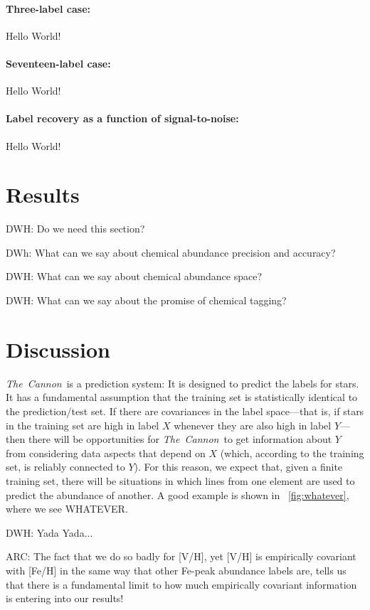\documentclass[12pt,preprint]{aastex}
\newcommand{\project}[1]{\textsl{#1}}
\newcommand{\TheCannon}{\project{The~Cannon}}
\begin{document}
\paragraph{Three-label case:}
Hello World!

\paragraph{Seventeen-label case:}
Hello World!

\paragraph{Label recovery as a function of signal-to-noise:}
Hello World!

\section{Results}

DWH: Do we need this section?

DWh: What can we say about chemical abundance precision and accuracy?

DWH: What can we say about chemical abundance space?

DWH: What can we say about the promise of chemical tagging?

\section{Discussion}


\TheCannon\ is a prediction system: It is designed to predict the labels for 
stars.  It has a fundamental assumption that the training set is statistically
identical to the prediction/test set.  If there are covariances in the label 
space---that is, if stars in the training set are high in label $X$ whenever
they are also high in label $Y$---then there will be opportunities for 
\TheCannon\ to get information about $Y$ from considering data aspects that 
depend on $X$ (which, according to the training set, is reliably connected to 
$Y$).  For this reason, we expect that, given a finite training set, there will
be situations in which lines from one element are used to predict the abundance
of another.  A good example is shown in \figurename~\ref{fig:whatever}, where we
see WHATEVER.

DWH: Yada Yada...


ARC: The fact that we do so badly for [V/H], yet [V/H] is empirically covariant with [Fe/H] in the same way that other Fe-peak abundance labels are, tells us that there is a fundamental limit to how much empirically covariant information is entering into our results!
\end{document}
